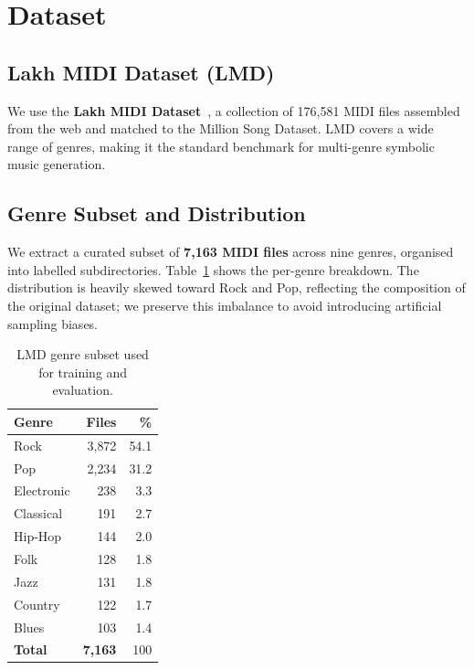 \documentclass[letterpaper]{article}
\begin{document}
\section{Dataset}
\label{sec:dataset}

\subsection{Lakh MIDI Dataset (LMD)}

We use the \textbf{Lakh MIDI Dataset}~\cite{raffel2016lmd}, a collection of
176{,}581 MIDI files assembled from the web and matched to the Million Song
Dataset.  LMD covers a wide range of genres, making it the standard
benchmark for multi-genre symbolic music generation.

\subsection{Genre Subset and Distribution}

We extract a curated subset of \textbf{7{,}163 MIDI files} across nine
genres, organised into labelled subdirectories.
Table~\ref{tab:dataset} shows the per-genre breakdown.
The distribution is heavily skewed toward Rock and Pop, reflecting the
composition of the original dataset; we preserve this imbalance to avoid
introducing artificial sampling biases.

\begin{table}[ht]
  \centering
  \caption{LMD genre subset used for training and evaluation.}
  \label{tab:dataset}
  \small
  \begin{tabular}{lrr}
    \toprule
    \textbf{Genre} & \textbf{Files} & \textbf{\%} \\
    \midrule
    Rock        & 3{,}872 & 54.1 \\
    Pop         & 2{,}234 & 31.2 \\
    Electronic  &   238   & 3.3  \\
    Classical   &   191   & 2.7  \\
    Hip-Hop     &   144   & 2.0  \\
    Folk        &   128   & 1.8  \\
    Jazz        &   131   & 1.8  \\
    Country     &   122   & 1.7  \\
    Blues       &   103   & 1.4  \\
    \midrule
    \textbf{Total} & \textbf{7{,}163} & 100 \\
    \bottomrule
  \end{tabular}
\end{table}
\end{document}
